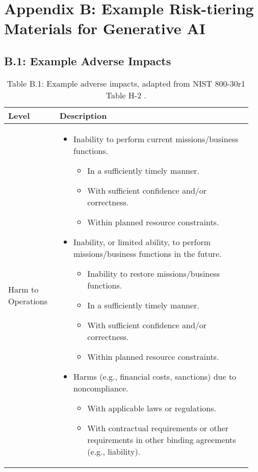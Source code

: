 \documentclass[fleqn]{article}
\begin{document}
\section*{Appendix B: Example Risk-tiering Materials for Generative AI}\label{sec:appndxb}

\subsection*{B.1: Example Adverse Impacts}

\begin{table}[H]
	\caption*{Table B.1: Example adverse impacts, adapted from NIST 800-30r1 Table H-2 \cite{nist80030r1}.}
	\footnotesize
	\begin{tabular}{|m{0.20\linewidth} | m{0.75\linewidth}|}
		\hline
		\textbf{Level} & \textbf{Description} \\ \hline
		Harm to Operations & 
		\begin{itemize}[noitemsep]
			\item Inability to perform current missions/business functions.
			\begin{itemize}[noitemsep,nolistsep]
				\item In a sufficiently timely manner.
				\item With sufficient confidence and/or correctness.
				\item Within planned resource constraints.
			\end{itemize}
			\item Inability, or limited ability, to perform missions/business functions in the future.           	
			\begin{itemize}[noitemsep,nolistsep]
				\item Inability to restore missions/business functions.
				\item In a sufficiently timely manner.
				\item With sufficient confidence and/or correctness.
				\item Within planned resource constraints.
			\end{itemize}
			\item Harms (e.g., financial costs, sanctions) due to noncompliance. 
			\begin{itemize}[noitemsep,nolistsep]
				\item With applicable laws or regulations.
				\item With contractual requirements or other requirements in other binding agreements (e.g., liability).

\end{itemize}
\end{itemize}
\end{tabular}
\end{table}
\end{document}
